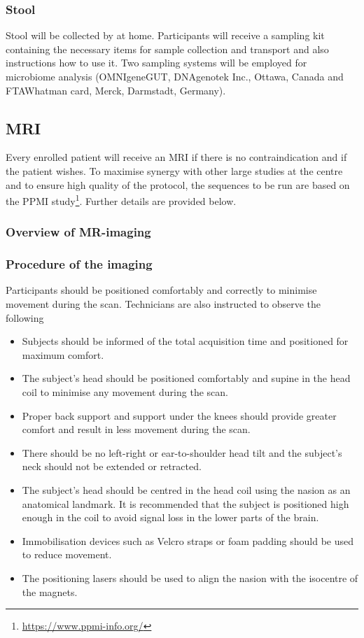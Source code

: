 \subsubsection{Stool}
\label{biosamples:stool}
Stool will be collected by at home. Participants will receive a sampling kit containing the necessary items for sample collection and transport and also instructions how to use it. Two sampling systems will be employed for microbiome analysis (OMNIgeneGUT, DNAgenotek Inc., Ottawa, Canada and FTAWhatman card, Merck, Darmstadt, Germany). 

\subsection{\ac{MRI}}
\label{subsec:MRI}
Every enrolled patient will receive an \ac{MRI} if there is no contraindication and if the patient wishes. To maximise synergy with other large studies at the centre and to ensure high quality of the protocol, the sequences to be run are based on the \ac{PPMI} study\footnote{\url{https://www.ppmi-info.org/}}. Further details are provided below.
\subsubsection{Overview of MR-imaging}

\subsubsection{Procedure of the imaging}
Participants should be positioned comfortably and correctly to minimise movement during the scan. Technicians are also instructed to observe the following
\begin{itemize}[noitemsep,topsep=0pt]
\item Subjects should be informed of the total acquisition time and positioned for maximum comfort.
\item The subject's head should be positioned comfortably and supine in the head coil to minimise any movement during the scan.
\item Proper back support and support under the knees should provide greater comfort and result in less movement during the scan.
\item There should be no left-right or ear-to-shoulder head tilt and the subject's neck should not be extended or retracted.
\item The subject's head should be centred in the head coil using the nasion as an anatomical landmark. It is recommended that the subject is positioned high enough in the coil to avoid signal loss in the lower parts of the brain.
\item Immobilisation devices such as Velcro straps or foam padding should be used to reduce movement.
\item The positioning lasers should be used to align the nasion with the isocentre of the magnets.
\end{itemize}


